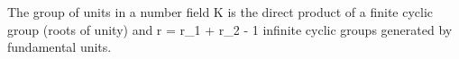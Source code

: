 The group of units in a number field K is the direct product of a finite cyclic group (roots of unity) and r = r_1 + r_2 - 1 infinite cyclic groups generated by fundamental units.
